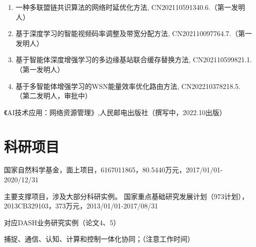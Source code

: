 \documentclass{resume}
\begin{document}
\begin{enumerate}
    \item 一种多联盟链共识算法的网络时延优化方法, CN202110591340.6.（第一发明人）
    \item 基于深度学习的智能视频码率调整及带宽分配方法, CN202110097764.7.（第一发明人）
    \item 基于智能体深度增强学习的多边缘基站联合缓存替换方法, CN202110599821.1.（第一发明人）
    \item 基于多智能体增强学习的WSN能量效率优化路由方法, CN202210378218.5.（第二发明人，审批中）
\end{enumerate}
《AI技术应用：网络资源管理》,人民邮电出版社（撰写中，2022.10出版）


\section{科研项目}
国家自然科学基金，面上项目，6167011865，80.5440万元，2017/01/01-2020/12/31

主要支撑项目，涉及大部分科研实例。
国家重点基础研究发展计划（973计划），2013CB329103，373万元，2013/01/01-2017/08/31

对应DASH业务研究实例（论文4、5）

捕捉、通信、认知、计算和控制一体化协同；（注意工作时间）
\end{document}
